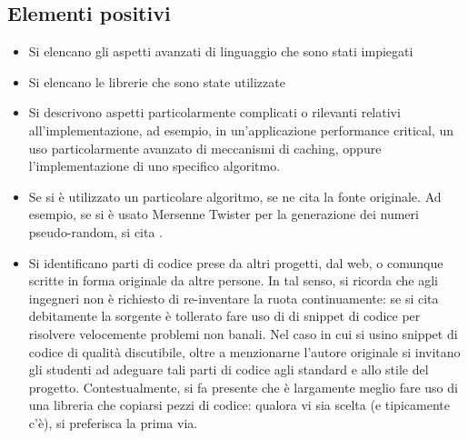 \documentclass[a4paper,12pt]{report}
\begin{document}
\subsection*{Elementi positivi}

\begin{itemize}
	\item Si elencano gli aspetti avanzati di linguaggio che sono stati impiegati
	\item Si elencano le librerie che sono state utilizzate
	\item Si descrivono aspetti particolarmente complicati o rilevanti relativi all'implementazione, 
ad esempio, in un'applicazione performance critical, un uso particolarmente avanzato di meccanismi 
di caching, oppure l'implementazione di uno specifico algoritmo.
	\item Se si è utilizzato un particolare algoritmo, se ne cita la fonte originale. Ad esempio, se 
si è usato Mersenne Twister per la generazione dei numeri pseudo-random, si cita \cite{mersenne}.
	\item Si identificano parti di codice prese da altri progetti, dal web, o comunque scritte in forma originale da altre persone. In tal senso, si ricorda che agli ingegneri non è richiesto di re-inventare la ruota continuamente: se si cita debitamente la sorgente è tollerato fare uso di di snippet di codice per risolvere velocemente problemi non banali. Nel caso in cui si usino snippet di codice di qualità discutibile, oltre a menzionarne l'autore originale si invitano gli studenti ad adeguare tali parti di codice agli standard e allo stile del progetto. Contestualmente, si fa presente che è largamente meglio fare uso di una libreria che copiarsi pezzi di codice: qualora vi sia scelta (e tipicamente c'è), si preferisca la prima via.
\end{itemize}
\end{document}
